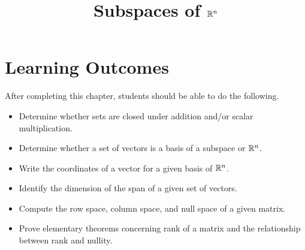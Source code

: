 \documentclass{ximera}
\title{Subspaces of $\mathbb{R}^n$}
\begin{document}
\begin{abstract}

\end{abstract}
 
\maketitle
 
\section*{Learning Outcomes}
After completing this chapter, students should be able to do the following.
 
\begin{itemize}
    \item Determine whether sets are closed under addition and/or scalar multiplication.
    \item Determine whether a set of vectors is a basis of a subspace or $\mathbb{R}^n$.
    \item Write the coordinates of a vector for a given basis of $\mathbb{R}^n$.
    \item Identify the dimension of the span of a given set of vectors.   
    \item Compute the row space, column space, and null space of a given matrix.
    \item  Prove elementary theorems concerning rank of a matrix and the relationship between rank and nullity.
 
\end{itemize}

 
\end{document}
